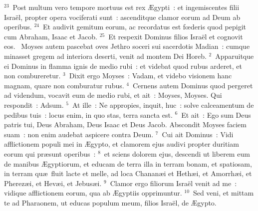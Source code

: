 ${}^{23}$~Post multum vero tempore mortuus est rex \AE gypti~: et ingemiscentes filii Isra\"el, propter opera vociferati sunt~: ascenditque clamor eorum ad Deum ab operibus.
${}^{24}$~Et audivit gemitum eorum, ac recordatus est fœderis quod pepigit cum Abraham, Isaac et Jacob.
${}^{25}$~Et respexit Dominus filios Isra\"el et cognovit eos.
~\lettrine[lines=10,image=true,loversize=0.05,lraise=-0.03]{M}{}oyses autem pascebat oves Jethro soceri sui sacerdotis Madian~: cumque minasset gregem ad interiora deserti, venit ad montem Dei Horeb.
${}^{2}$~Apparuitque ei Dominus in flamma ignis de medio rubi~: et videbat quod rubus arderet, et non combureretur.
${}^{3}$~Dixit ergo Moyses~: Vadam, et videbo visionem hanc magnam, quare non comburatur rubus.
${}^{4}$~Cernens autem Dominus quod pergeret ad videndum, vocavit eum de medio rubi, et ait~: Moyses, Moyses. Qui respondit~: Adsum.
${}^{5}$~At ille~: Ne appropies, inquit, huc~: solve calceamentum de pedibus tuis~: locus enim, in quo stas, terra sancta est.
${}^{6}$~Et ait~: Ego sum Deus patris tui, Deus Abraham, Deus Isaac et Deus Jacob. Abscondit Moyses faciem suam~: non enim audebat aspicere contra Deum.
${}^{7}$~Cui ait Dominus~: Vidi afflictionem populi mei in \AE gypto, et clamorem ejus audivi propter duritiam eorum qui pr\ae sunt operibus~:
${}^{8}$~et sciens dolorem ejus, descendi ut liberem eum de manibus \AE gyptiorum, et educam de terra illa in terram bonam, et spatiosam, in terram qu\ae\ fluit lacte et melle, ad loca Chanan\ae i et Heth\ae i, et Amorrh\ae i, et Pherez\ae i, et Hev\ae i, et Jebus\ae i.
${}^{9}$~Clamor ergo filiorum Isra\"el venit ad me~: vidique afflictionem eorum, qua ab \AE gyptiis opprimuntur.
${}^{10}$~Sed veni, et mittam te ad Pharaonem, ut educas populum meum, filios Isra\"el, de \AE gypto.


